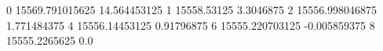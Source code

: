 0 15569.791015625 14.564453125
1 15558.53125 3.3046875
2 15556.998046875 1.771484375
4 15556.14453125 0.91796875
6 15555.220703125 -0.005859375
8 15555.2265625 0.0
